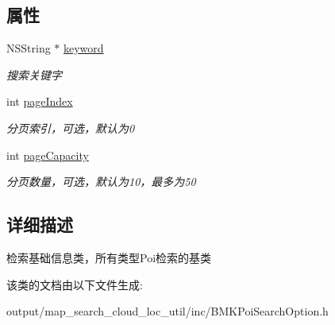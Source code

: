 \subsection*{属性}
\begin{DoxyCompactItemize}
\item 
\hypertarget{interface_b_m_k_base_poi_search_option_af74b52da74e6d70c2904774938d4358a}{N\+S\+String $\ast$ \hyperlink{interface_b_m_k_base_poi_search_option_af74b52da74e6d70c2904774938d4358a}{keyword}}\label{interface_b_m_k_base_poi_search_option_af74b52da74e6d70c2904774938d4358a}

\begin{DoxyCompactList}\small\item\em 搜索关键字 \end{DoxyCompactList}\item 
\hypertarget{interface_b_m_k_base_poi_search_option_a23b7f5ccb9cdb0c77dc80e57039be011}{int \hyperlink{interface_b_m_k_base_poi_search_option_a23b7f5ccb9cdb0c77dc80e57039be011}{page\+Index}}\label{interface_b_m_k_base_poi_search_option_a23b7f5ccb9cdb0c77dc80e57039be011}

\begin{DoxyCompactList}\small\item\em 分页索引，可选，默认为0 \end{DoxyCompactList}\item 
\hypertarget{interface_b_m_k_base_poi_search_option_a6c4467b4e1f98bebf75d59f95b6fc85d}{int \hyperlink{interface_b_m_k_base_poi_search_option_a6c4467b4e1f98bebf75d59f95b6fc85d}{page\+Capacity}}\label{interface_b_m_k_base_poi_search_option_a6c4467b4e1f98bebf75d59f95b6fc85d}

\begin{DoxyCompactList}\small\item\em 分页数量，可选，默认为10，最多为50 \end{DoxyCompactList}\end{DoxyCompactItemize}


\subsection{详细描述}
检索基础信息类，所有类型\+Poi检索的基类 

该类的文档由以下文件生成\+:\begin{DoxyCompactItemize}
\item 
output/map\+\_\+search\+\_\+cloud\+\_\+loc\+\_\+util/inc/B\+M\+K\+Poi\+Search\+Option.\+h\end{DoxyCompactItemize}
